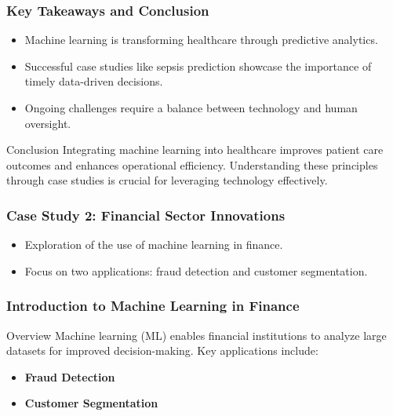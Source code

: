 \documentclass{beamer}
\begin{document}
\begin{frame}[fragile]
    \frametitle{Key Takeaways and Conclusion}
    \begin{itemize}
        \item Machine learning is transforming healthcare through predictive analytics.
        \item Successful case studies like sepsis prediction showcase the importance of timely data-driven decisions.
        \item Ongoing challenges require a balance between technology and human oversight.
    \end{itemize}
    \begin{block}{Conclusion}
        Integrating machine learning into healthcare improves patient care outcomes and enhances operational efficiency. Understanding these principles through case studies is crucial for leveraging technology effectively.
    \end{block}
\end{frame}

\begin{frame}[fragile]
    \frametitle{Case Study 2: Financial Sector Innovations}
    \begin{itemize}
        \item Exploration of the use of machine learning in finance.
        \item Focus on two applications: fraud detection and customer segmentation.
    \end{itemize}
\end{frame}

\begin{frame}[fragile]
    \frametitle{Introduction to Machine Learning in Finance}
    \begin{block}{Overview}
        Machine learning (ML) enables financial institutions to analyze large datasets for improved decision-making. Key applications include:
    \end{block}
    \begin{itemize}
        \item \textbf{Fraud Detection}
        \item \textbf{Customer Segmentation}
    \end{itemize}
\end{frame}
\end{document}
